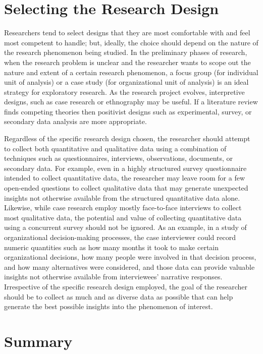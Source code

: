 \section{Selecting the Research Design}

Researchers tend to select designs that they are most comfortable with and feel most competent to handle; but, ideally, the choice should depend on the nature of the research phenomenon being studied. In the preliminary phases of research, when the research problem is unclear and the researcher wants to scope out the nature and extent of a certain research phenomenon, a focus group (for individual unit of analysis) or a case study (for organizational unit of analysis) is an ideal strategy for exploratory research. As the research project evolves, interpretive designs, such as case research or ethnography may be useful. If a literature review finds competing theories then positivist designs such as experimental, survey, or secondary data analysis are more appropriate.

Regardless of the specific research design chosen, the researcher should attempt to collect both quantitative and qualitative data using a combination of techniques such as questionnaires, interviews, observations, documents, or secondary data. For example, even in a highly structured survey questionnaire intended to collect quantitative data, the researcher may leave room for a few open-ended questions to collect qualitative data that may generate unexpected insights not otherwise available from the structured quantitative data alone. Likewise, while case research employ mostly face-to-face interviews to collect most qualitative data, the potential and value of collecting quantitative data using a concurrent survey should not be ignored. As an example, in a study of organizational decision-making processes, the case interviewer could record numeric quantities such as how many months it took to make certain organizational decisions, how many people were involved in that decision process, and how many alternatives were considered, and those data can provide valuable insights not otherwise available from interviewees' narrative responses. Irrespective of the specific research design employed, the goal of the researcher should be to collect as much and as diverse data as possible that can help generate the best possible insights into the phenomenon of interest.

\section{Summary}\label{ch04:summary}

